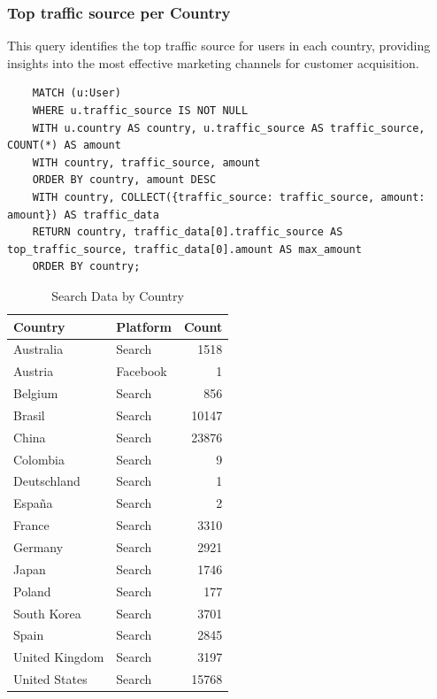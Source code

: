 \documentclass[a4paper,12pt]{article}
\begin{document}
  \subsubsection{Top traffic source per Country}
  This query identifies the top traffic source for users in each country, providing insights into the most effective marketing channels for customer acquisition.
  \begin{verbatim}
    MATCH (u:User)
    WHERE u.traffic_source IS NOT NULL
    WITH u.country AS country, u.traffic_source AS traffic_source, COUNT(*) AS amount
    WITH country, traffic_source, amount
    ORDER BY country, amount DESC
    WITH country, COLLECT({traffic_source: traffic_source, amount: amount}) AS traffic_data
    RETURN country, traffic_data[0].traffic_source AS top_traffic_source, traffic_data[0].amount AS max_amount
    ORDER BY country;
  \end{verbatim}  

  \begin{table}[h!]
    \centering
    \caption{Search Data by Country}
    \label{tab:search_data}
    \begin{tabular}{l l r}
        \toprule
        \textbf{Country} & \textbf{Platform} & \textbf{Count} \\
        \midrule
        Australia       & Search & 1518 \\
        Austria         & Facebook & 1 \\
        Belgium         & Search & 856 \\
        Brasil          & Search & 10147 \\
        China           & Search & 23876 \\
        Colombia        & Search & 9 \\
        Deutschland     & Search & 1 \\
        España          & Search & 2 \\
        France          & Search & 3310 \\
        Germany         & Search & 2921 \\
        Japan           & Search & 1746 \\
        Poland          & Search & 177 \\
        South Korea     & Search & 3701 \\
        Spain           & Search & 2845 \\
        United Kingdom  & Search & 3197 \\
        United States   & Search & 15768 \\
        \bottomrule
    \end{tabular}
\end{table}
\end{document}
